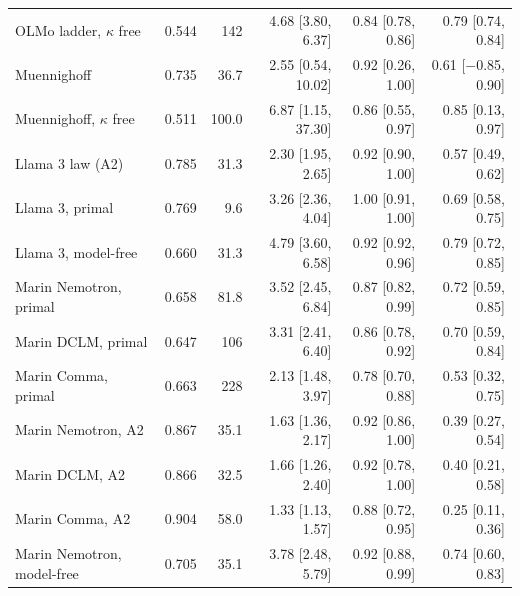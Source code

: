\begin{table}[tp]
{\begin{tabular}{@{}lrrrrrrr@{}}
OLMo ladder, $\kappa$ free & 0.544 & 142 & \multicolumn{2}{r}{4.68 {\scriptsize[3.80, 6.37]}} & \multicolumn{2}{r}{0.84 {\scriptsize[0.78, 0.86]}} & 0.79 {\scriptsize[0.74, 0.84]} \\
Muennighoff & 0.735 & 36.7 & \multicolumn{2}{r}{2.55 {\scriptsize[0.54, 10.02]}} & \multicolumn{2}{r}{0.92 {\scriptsize[0.26, 1.00]}} & 0.61 {\scriptsize[$-$0.85, 0.90]} \\
Muennighoff, $\kappa$ free & 0.511 & 100.0 & \multicolumn{2}{r}{6.87 {\scriptsize[1.15, 37.30]}} & \multicolumn{2}{r}{0.86 {\scriptsize[0.55, 0.97]}} & 0.85 {\scriptsize[0.13, 0.97]} \\
Llama 3 law (A2) & 0.785 & 31.3 & \multicolumn{2}{r}{2.30 {\scriptsize[1.95, 2.65]}} & \multicolumn{2}{r}{0.92 {\scriptsize[0.90, 1.00]}} & 0.57 {\scriptsize[0.49, 0.62]} \\
Llama 3, primal & 0.769 & 9.6 & \multicolumn{2}{r}{3.26 {\scriptsize[2.36, 4.04]}} & \multicolumn{2}{r}{1.00 {\scriptsize[0.91, 1.00]}} & 0.69 {\scriptsize[0.58, 0.75]} \\
Llama 3, model-free & 0.660 & 31.3 & \multicolumn{2}{r}{4.79 {\scriptsize[3.60, 6.58]}} & \multicolumn{2}{r}{0.92 {\scriptsize[0.92, 0.96]}} & 0.79 {\scriptsize[0.72, 0.85]} \\
Marin Nemotron, primal & 0.658 & 81.8 & \multicolumn{2}{r}{3.52 {\scriptsize[2.45, 6.84]}} & \multicolumn{2}{r}{0.87 {\scriptsize[0.82, 0.99]}} & 0.72 {\scriptsize[0.59, 0.85]} \\
Marin DCLM, primal & 0.647 & 106 & \multicolumn{2}{r}{3.31 {\scriptsize[2.41, 6.40]}} & \multicolumn{2}{r}{0.86 {\scriptsize[0.78, 0.92]}} & 0.70 {\scriptsize[0.59, 0.84]} \\
Marin Comma, primal & 0.663 & 228 & \multicolumn{2}{r}{2.13 {\scriptsize[1.48, 3.97]}} & \multicolumn{2}{r}{0.78 {\scriptsize[0.70, 0.88]}} & 0.53 {\scriptsize[0.32, 0.75]} \\
Marin Nemotron, A2 & 0.867 & 35.1 & \multicolumn{2}{r}{1.63 {\scriptsize[1.36, 2.17]}} & \multicolumn{2}{r}{0.92 {\scriptsize[0.86, 1.00]}} & 0.39 {\scriptsize[0.27, 0.54]} \\
Marin DCLM, A2 & 0.866 & 32.5 & \multicolumn{2}{r}{1.66 {\scriptsize[1.26, 2.40]}} & \multicolumn{2}{r}{0.92 {\scriptsize[0.78, 1.00]}} & 0.40 {\scriptsize[0.21, 0.58]} \\
Marin Comma, A2 & 0.904 & 58.0 & \multicolumn{2}{r}{1.33 {\scriptsize[1.13, 1.57]}} & \multicolumn{2}{r}{0.88 {\scriptsize[0.72, 0.95]}} & 0.25 {\scriptsize[0.11, 0.36]} \\
Marin Nemotron, model-free & 0.705 & 35.1 & \multicolumn{2}{r}{3.78 {\scriptsize[2.48, 5.79]}} & \multicolumn{2}{r}{0.92 {\scriptsize[0.88, 0.99]}} & 0.74 {\scriptsize[0.60, 0.83]} \\

\end{tabular}}
\end{table}
